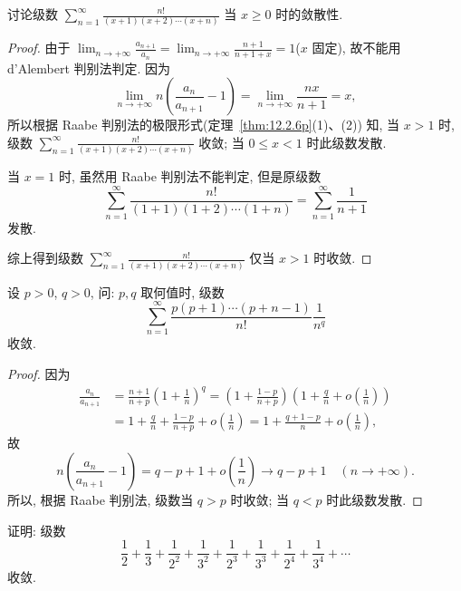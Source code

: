\begin{example}\label{ex:12.2.12}
讨论级数 $\sum_{n=1}^{\infty}\frac{n!}{(x+1)(x+2)\cdots(x+n)}$ 当 $x\geqslant0$ 时的敛散性.
\end{example}

\begin{proof}
由于 $\lim_{n\to+\infty}\frac{a_{n+1}}{a_{n}}=\lim_{n\to+\infty}\frac{n+1}{n+1+x}=1$($x$ 固定), 故不能用 d'Alembert 判别法判定. 因为
\[
  \lim_{n\to+\infty}n\left(\frac{a_{n}}{a_{n+1}}-1\right)=\lim_{n\to+\infty}\frac{nx}{n+1}=x,
\]
所以根据 Raabe 判别法的极限形式(定理~\ref{thm:12.2.6p}(1)、(2)) 知, 当 $x>1$ 时, 级数 $\sum_{n=1}^{\infty}\frac{n!}{(x+1)(x+2)\cdots(x+n)}$ 收敛; 当 $0\leqslant x<1$ 时此级数发散.

当 $x=1$ 时, 虽然用 Raabe 判别法不能判定, 但是原级数
\[
  \sum_{n=1}^{\infty}\frac{n!}{(1+1)(1+2)\cdots(1+n)}
  =\sum_{n=1}^{\infty}\frac{1}{n+1}
\]
发散.

综上得到级数 $\sum_{n=1}^{\infty}\frac{n!}{(x+1)(x+2)\cdots(x+n)}$ 仅当 $x>1$ 时收敛.
\end{proof}

\begin{example}\label{ex:12.2.13}
设 $p>0$, $q>0$, 问: $p,q$ 取何值时, 级数
\[
  \sum_{n=1}^{\infty}\frac{p(p+1)\cdots(p+n-1)}{n!}\frac{1}{n^{q}}
\]
收敛.
\end{example}

\begin{proof}
因为
\begin{align*}
  \frac{a_{n}}{a_{n+1}}
  &=\frac{n+1}{n+p}\left(1+\frac{1}{n}\right)^{q}
   =\left(1+\frac{1-p}{n+p}\right)\left(1+\frac{q}{n}+o\left(\frac{1}{n}\right)\right) \\
  &=1+\frac{q}{n}+\frac{1-p}{n+p}+o\left(\frac{1}{n}\right)
   =1+\frac{q+1-p}{n}+o\left(\frac{1}{n}\right),
\end{align*}
故
\[
  n\left(\frac{a_{n}}{a_{n+1}}-1\right)
  =q-p+1+o\left(\frac{1}{n}\right)\to q-p+1\quad(n\to+\infty).
\]
所以, 根据 Raabe 判别法, 级数当 $q>p$ 时收敛; 当 $q<p$ 时此级数发散.
\end{proof}

\begin{example}\label{ex:12.2.14}
证明: 级数
\[
  \frac{1}{2}+\frac{1}{3}+\frac{1}{2^{2}}+\frac{1}{3^{2}}+\frac{1}{2^{3}}+\frac{1}{3^{3}}
  +\frac{1}{2^{4}}+\frac{1}{3^{4}}+\cdots
\]
收敛.
\end{example}

